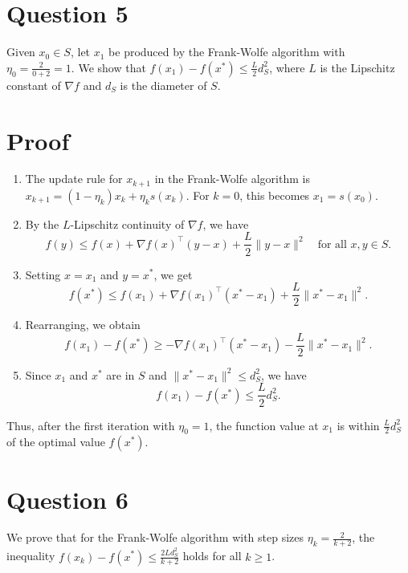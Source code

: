 \documentclass[12p]{article}
\begin{document}
\section*{Question 5} 

Given \( x_0 \in S \), let \( x_1 \) be produced by the Frank-Wolfe algorithm with \( \eta_0 = \frac{2}{0+2} = 1 \). We show that \( f(x_1) - f(x^*) \leq \frac{L}{2} d_S^2 \), where \( L \) is the Lipschitz constant of \( \nabla f \) and \( d_S \) is the diameter of \( S \).

\section*{Proof}

\begin{enumerate}
    \item The update rule for \( x_{k+1} \) in the Frank-Wolfe algorithm is \( x_{k+1} = (1 - \eta_k) x_k + \eta_k s(x_k) \). For \( k = 0 \), this becomes \( x_1 = s(x_0) \).

    \item By the \( L \)-Lipschitz continuity of \( \nabla f \), we have
    \[ f(y) \leq f(x) + \nabla f(x)^\top (y - x) + \frac{L}{2} \|y - x\|^2 \quad \text{for all } x, y \in S. \]

    \item Setting \( x = x_1 \) and \( y = x^* \), we get
    \[ f(x^*) \leq f(x_1) + \nabla f(x_1)^\top (x^* - x_1) + \frac{L}{2} \|x^* - x_1\|^2. \]

    \item Rearranging, we obtain
    \[ f(x_1) - f(x^*) \geq - \nabla f(x_1)^\top (x^* - x_1) - \frac{L}{2} \|x^* - x_1\|^2. \]

    \item Since \( x_1 \) and \( x^* \) are in \( S \) and \( \|x^* - x_1\|^2 \leq d_S^2 \), we have
    \[ f(x_1) - f(x^*) \leq \frac{L}{2} d_S^2. \]
\end{enumerate}

Thus, after the first iteration with \( \eta_0 = 1 \), the function value at \( x_1 \) is within \( \frac{L}{2} d_S^2 \) of the optimal value \( f(x^*) \).



\section*{Question 6} 

We prove that for the Frank-Wolfe algorithm with step sizes \( \eta_k = \frac{2}{k+2} \), the inequality \( f(x_k) - f(x^*) \leq \frac{2Ld^2_S}{k+2} \) holds for all \( k \geq 1 \).
\end{document}
